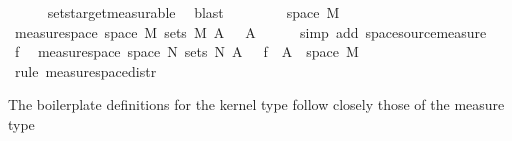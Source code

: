 \begin{isabellebody}
\ \ \ \ \isamarkupfalse%
\ sets{\isacharunderscore}{\kern0pt}target{\isacharunderscore}{\kern0pt}measurable\ \isamarkupfalse%
\ blast\isanewline
{}\isamarkupfalse%
\isanewline
\ \ \isamarkupfalse%
\ {\isasymomega}\ \isamarkupfalse%
\ {\isachardoublequoteopen}{\isasymomega}\ {\isasymin}\ space\ M{\isachardoublequoteclose}\isanewline
\ \ \isamarkupfalse%
\ \isamarkupfalse%
\ {\isachardoublequoteopen}measure{\isacharunderscore}{\kern0pt}space\ {\isacharparenleft}{\kern0pt}space\ M{\isacharprime}{\kern0pt}{\isacharparenright}{\kern0pt}\ {\isacharparenleft}{\kern0pt}sets\ M{\isacharprime}{\kern0pt}{\isacharparenright}{\kern0pt}\ {\isacharparenleft}{\kern0pt}{\isasymlambda}A{\isacharprime}{\kern0pt}{\isachardot}{\kern0pt}\ {\isasymkappa}\ {\isasymomega}\ A{\isacharprime}{\kern0pt}{\isacharparenright}{\kern0pt}{\isachardoublequoteclose}\isanewline
\ \ \ \ \isamarkupfalse%
\ {\isacharparenleft}{\kern0pt}simp\ add{\isacharcolon}{\kern0pt}\ space{\isacharunderscore}{\kern0pt}source{\isacharunderscore}{\kern0pt}measure{\isacharparenright}{\kern0pt}\isanewline
\ \ \isamarkupfalse%
\ f\ \isamarkupfalse%
\ {\isachardoublequoteopen}measure{\isacharunderscore}{\kern0pt}space\ {\isacharparenleft}{\kern0pt}space\ N{\isacharprime}{\kern0pt}{\isacharparenright}{\kern0pt}\ {\isacharparenleft}{\kern0pt}sets\ N{\isacharprime}{\kern0pt}{\isacharparenright}{\kern0pt}\ {\isacharparenleft}{\kern0pt}{\isasymlambda}A{\isacharprime}{\kern0pt}{\isachardot}{\kern0pt}\ {\isasymkappa}\ {\isasymomega}\ {\isacharparenleft}{\kern0pt}f\ {\isacharminus}{\kern0pt}{\isacharbackquote}{\kern0pt}\ A{\isacharprime}{\kern0pt}\ {\isasyminter}\ space\ M{\isacharprime}{\kern0pt}{\isacharparenright}{\kern0pt}{\isacharparenright}{\kern0pt}{\isachardoublequoteclose}\isanewline
\ \ \ \ \isamarkupfalse%
\ {\isacharparenleft}{\kern0pt}rule\ measure{\isacharunderscore}{\kern0pt}space{\isacharunderscore}{\kern0pt}distr{\isacharparenright}{\kern0pt}\isanewline
{}\isamarkupfalse%
%
\endisatagproof
{\isafoldproof}%
%
\isadelimproof
%
\endisadelimproof
%
\isadelimdocument
%
\endisadelimdocument
%
\isatagdocument
%
\isamarkuptrue%
%
\endisatagdocument
{\isafolddocument}%
%
\isadelimdocument
%
\endisadelimdocument
%
\begin{isamarkuptext}%
The boilerplate definitions for the kernel type follow closely those of the measure type

\end{isamarkuptext}
\end{isabellebody}
